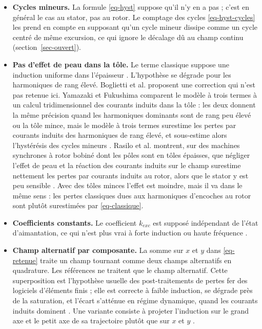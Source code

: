 \documentclass[11pt,a4paper]{article}
\begin{document}
\begin{itemize}
    \item \textbf{Cycles mineurs.} La formule \eqref{eq-hyst} suppose qu'il n'y en a pas ; c'est en général le cas au stator, pas au rotor. Le comptage des cycles \eqref{eq-hyst-cycles} les prend en compte en supposant qu'un cycle mineur dissipe comme un cycle centré de même excursion, ce qui ignore le décalage dû au champ continu (section~\ref{sec-ouvert}).
    \item \textbf{Pas d'effet de peau dans la tôle.} Le terme classique suppose une induction uniforme dans l'épaisseur \cite[\S~I.1-B.3]{Hel21}. L'hypothèse se dégrade pour les harmoniques de rang élevé. Boglietti et al. proposent une correction \cite[Eq.~4]{Bog03} qui n'est pas retenue ici. Yamazaki et Fukushima comparent le modèle à trois termes à un calcul tridimensionnel des courants induits dans la tôle : les deux donnent la même précision quand les harmoniques dominants sont de rang peu élevé ou la tôle mince, mais le modèle à trois termes surestime les pertes par courants induits des harmoniques de rang élevé, et sous-estime alors l'hystérésis des cycles mineurs \cite[\S~III]{Yam10}. Rasilo et al. montrent, sur des machines synchrones à rotor bobiné dont les pôles sont en tôles épaisses, que négliger l'effet de peau et la réaction des courants induits sur le champ surestime nettement les pertes par courants induits au rotor, alors que le stator y est peu sensible \cite[\S~III-E]{Ras12}. Avec des tôles minces l'effet est moindre, mais il va dans le même sens : les pertes classiques dues aux harmoniques d'encoches au rotor sont plutôt surestimées par \eqref{eq-classique}.
    \item \textbf{Coefficients constants.} Le coefficient $k_{exc}$ est supposé indépendant de l'état d'aimantation, ce qui n'est plus vrai à forte induction ou haute fréquence \cite[\S~I.1-B.3]{Hel21}.
    \item \textbf{Champ alternatif par composante.} La somme sur $x$ et $y$ dans \eqref{eq-retenue} traite un champ tournant comme deux champs alternatifs en quadrature. Les références \cite{Fio90,Ama95,Bog03} ne traitent que le champ alternatif. Cette superposition est l'hypothèse usuelle des post-traitements de pertes fer des logiciels d'éléments finis ; elle est correcte à faible induction, se dégrade près de la saturation, et l'écart s'atténue en régime dynamique, quand les courants induits dominent \cite[\S~V.1]{Car21}. Une variante consiste à projeter l'induction sur le grand axe et le petit axe de sa trajectoire plutôt que sur $x$ et $y$ \cite[\S~V.1]{Car21}.

\end{itemize}
\end{document}
